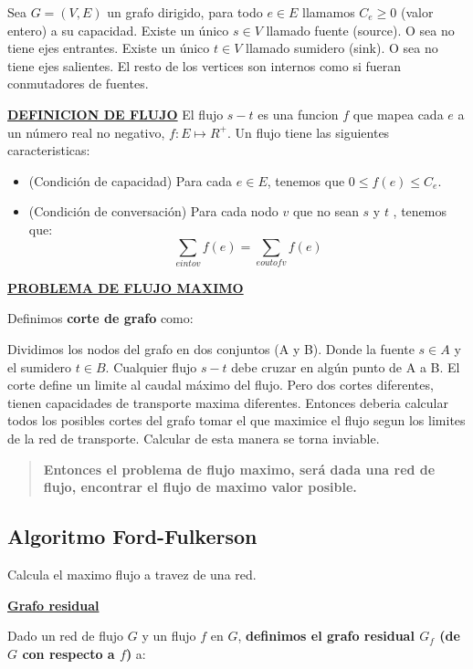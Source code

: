 \documentclass{article}
\begin{document}
Sea \(G=(V,E)\) un grafo dirigido, para todo \(e \in E\) llamamos \(C_e \geq 0\) (valor entero) a su capacidad.
Existe un único \(s \in V\) llamado fuente (source). O sea no tiene ejes entrantes.
Existe un único \(t \in V\) llamado sumidero (sink). O sea no tiene ejes salientes.
El resto de los vertices son internos como si fueran conmutadores de fuentes.

\noindent
\textbf{\underline{DEFINICION DE FLUJO}}
El flujo \(s-t\) es una funcion \(f\) que mapea cada \(e\) a un número real no negativo,
\(f: E \mapsto R^+\). Un flujo tiene las siguientes caracteristicas:

\begin{itemize}
    \item (Condición de capacidad) Para cada \(e \in E\), tenemos que \(0 \leq f(e) \leq C_e\).
    \item (Condición de conversación) Para cada nodo \(v\) que no sean \(s\) y \(t\) , tenemos que:
    \[
        \sum_{e into v} f(e)  = \sum_{e out of v} f(e) 
    \]
\end{itemize}

\noindent
\textbf{\underline{PROBLEMA DE FLUJO MAXIMO}}

Definimos \textbf{corte de grafo} como: 

Dividimos los nodos del grafo en dos conjuntos (A y B). Donde la fuente \(s \in A\) y 
el sumidero \(t \in B\). Cualquier flujo \(s-t\) debe cruzar en algún punto de A a B.
El corte define un limite al caudal máximo del flujo. Pero dos cortes diferentes, 
tienen capacidades de transporte maxima diferentes. Entonces deberia calcular todos
los posibles cortes del grafo tomar el que maximice el flujo segun los limites de la 
red de transporte. Calcular de esta manera se torna inviable.

\begin{quote}
    \textbf{Entonces el problema de flujo maximo, será dada una red de flujo, encontrar el flujo de maximo valor posible.}
\end{quote}


\newpage
\subsection{Algoritmo Ford-Fulkerson}

Calcula el maximo flujo a travez de una red.

\noindent
\underline{\textbf{Grafo residual}}

Dado un red de flujo \(G\) y un flujo \(f\) en \(G\), 
\textbf{definimos el grafo residual \(G_f\) (de \(G\) con respecto a \(f\))} a:
\end{document}
